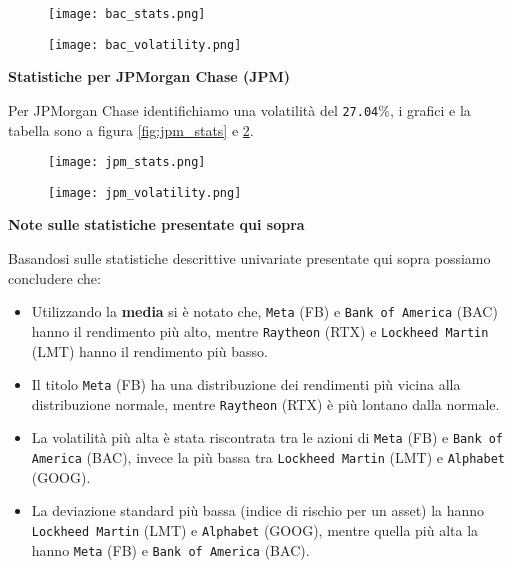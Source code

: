 \begin{figure}[h]
  \centering
  \begin{minipage}{.5\textwidth}
    \centering
    \vspace{4.35cm}
    \texttt{[image: bac\_stats.png]}
    \label{fig:bac_stats}
  \end{minipage}%
  \begin{minipage}{.5\textwidth}
    \centering
    \texttt{[image: bac\_volatility.png]}
    \label{fig:bac_vol}
  \end{minipage}
\end{figure}

\textbf{Statistiche per JPMorgan Chase (JPM)}

Per JPMorgan  Chase identifichiamo una volatilità del \verb|27.04|\%, i grafici e la tabella sono a figura \ref{fig:jpm_stats} e \ref{fig:jpm_vol}.

\begin{figure}[h]
  \centering
  \begin{minipage}{.5\textwidth}
    \centering
    \vspace{4.35cm}
    \texttt{[image: jpm\_stats.png]}
    \label{fig:jpm_stats}
  \end{minipage}%
  \begin{minipage}{.5\textwidth}
    \centering
    \texttt{[image: jpm\_volatility.png]}
    \label{fig:jpm_vol}
  \end{minipage}
\end{figure}

\textbf{Note sulle statistiche presentate qui sopra}

Basandosi sulle statistiche descrittive univariate presentate qui sopra possiamo concludere che:

\begin{itemize}
  \item Utilizzando la \textbf{media} si è notato che, \verb|Meta| (FB) e \verb|Bank of America| (BAC) hanno il rendimento più alto,
  mentre \verb|Raytheon| (RTX) e \verb|Lockheed Martin| (LMT) hanno il rendimento più basso.
  \item Il titolo \verb|Meta| (FB) ha una distribuzione dei rendimenti più vicina alla distribuzione normale, mentre 
  \verb|Raytheon| (RTX) è più lontano dalla normale.
  \item La volatilità più alta è stata riscontrata tra le azioni di \verb|Meta| (FB) e \verb|Bank of America| (BAC), invece
  la più bassa tra \verb|Lockheed Martin| (LMT) e \verb|Alphabet| (GOOG).
  \item La deviazione standard più bassa (indice di rischio per un asset) la hanno \verb|Lockheed Martin| (LMT) e \verb|Alphabet| (GOOG), mentre
  quella più alta la hanno \verb|Meta| (FB) e \verb|Bank of America| (BAC).
\end{itemize}

